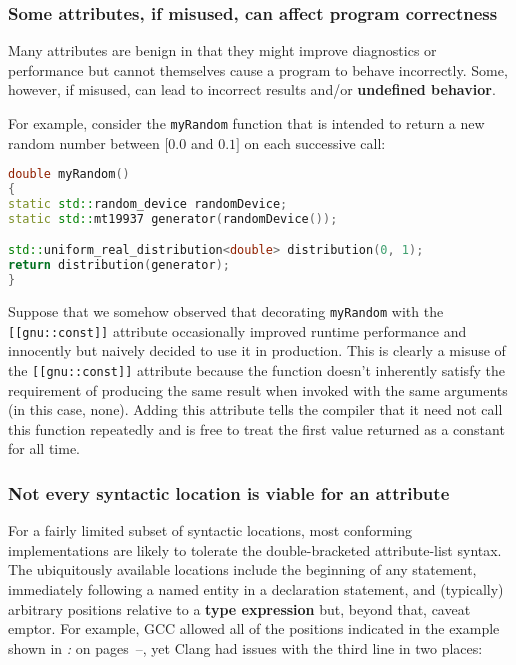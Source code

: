 \subsubsection[Some attributes, if misused, can affect program correctness]{Some attributes, if misused, can affect program correctness}\label{some-attributes,-if-misused,-can-affect-program-correctness}

Many attributes are benign in that they might improve diagnostics or
performance but cannot themselves cause a program to behave incorrectly.
Some, however, if misused, can lead to incorrect
results and/or \textbf{undefined behavior}.

For example, consider the \texttt{myRandom} function that is intended to
return a new random number between $[0.0$ and $0.1]$ on each successive
call:

\begin{lstlisting}[language=C++]
double myRandom()
{
static std::random_device randomDevice;
static std::mt19937 generator(randomDevice());

std::uniform_real_distribution<double> distribution(0, 1);
return distribution(generator);
}
\end{lstlisting}

\noindent Suppose that we somehow observed that decorating \texttt{myRandom} with
the \texttt{[[gnu::const]]} attribute occasionally improved runtime
performance and innocently but naively decided to use it in production. This
is clearly a misuse of the \texttt{[[gnu::const]]} attribute because the
function doesn't inherently satisfy the requirement of producing the
same result when invoked with the same arguments (in this case, none).
Adding this attribute tells the compiler that it need not call this
function repeatedly and is free to treat the first value returned as a
constant for all time.

\subsubsection[Not every syntactic location is viable for an attribute]{Not every syntactic location is viable for an attribute}\label{not-every-syntactic-location-is-viable-for-an-attribute}

For a fairly limited subset of syntactic locations, most
conforming implementations are likely to tolerate the double-bracketed
attribute-list syntax. The ubiquitously available locations include the
beginning of any statement, immediately following a named entity in a
declaration statement, and (typically) arbitrary positions relative to a
\textbf{type expression} but, beyond that, caveat emptor. For example, GCC
allowed all of the positions indicated in the example shown in
{\it{}:} {\it{}} on pages~\pageref{probing-where-attributes-are-permitted-in-the-compiler’s-c++-grammar}--\pageref{attribute-gcc-example}, yet Clang had
issues with the third line in two places:

